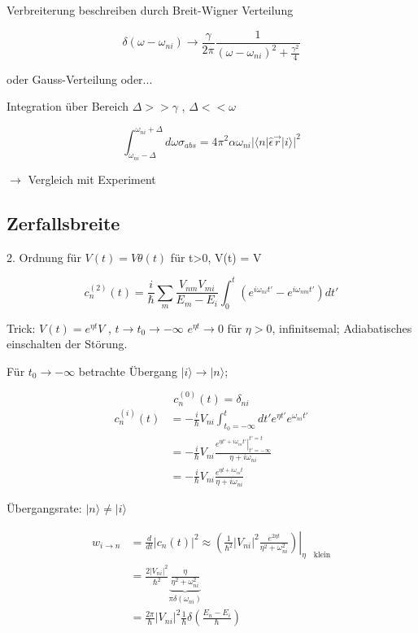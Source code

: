 Verbreiterung beschreiben durch Breit-Wigner Verteilung

\[ \delta(\omega-\omega_{ni}) \rightarrow \frac{\gamma}{2\pi}\frac{1}{(\omega-\omega_{ni})^2+\frac{\gamma^2}{4}}\]

oder Gauss-Verteilung oder...


Integration über Bereich \(\Delta > >\gamma\) , \(\Delta << \omega\)

\[\int_{\omega_{ni}-\Delta}^{\omega_{ni}+\Delta}d\omega\sigma_{abs} = 4\pi^2\alpha \omega_{ni}|\langle n|\hat\epsilon \vec r|i \rangle |^2\]

\(\rightarrow \) Vergleich mit Experiment


\subsection{Zerfallsbreite}

2. Ordnung für \(V(t)=V\theta(t)\) für t>0, V(t) = V

\[c^{(2)}_n(t) = \frac{i}{\hbar}\sum_m\frac{V_{nm}V_{mi}}{E_m-E_i}\int_0^t (e^{i\omega_{ni}t'}-e^{i\omega_{nm}t'})dt'\]

Trick: \(V(t) = e^{\eta t}V\) , \(t\rightarrow t_0\rightarrow -\infty\) \( e^{\eta t}\rightarrow 0\) für \(\eta>0\), infinitsemal; Adiabatisches einschalten der Störung.

Für \(t_0\rightarrow -\infty\) betrachte Übergang \(|i\rangle \rightarrow |n\rangle \);

\[c^{(0)}_n(t) = \delta_{ni}\]
\begin{align}
  c^{(i)}_n(t) &=  -\frac{i}{\hbar}V_{ni}\int_{t_0=-\infty}^t dt' e^{\eta t'}e^{\omega_{ni}t'}\\
  &= -\frac{i}{\hbar}V_{ni}\frac{\left.e^{\eta t'+i\omega_{ni}t'}\right|^{t'=t}_{t'=-\infty}}{\eta+i\omega_{ni}}\\
  &= -\frac{i}{\hbar}V_{ni}\frac{e^{\eta t+i\omega_{ni}t}}{\eta+i\omega_{ni}}
\end{align}

Übergangsrate: \(|n\rangle \neq |i\rangle \)

\begin{align}
  w_{i\rightarrow n} &= \frac{d}{dt} | c_n(t)|^2 \approx\left.\left(\frac{1}{\hbar^2}|V_{ni}|^2\frac{e^{2\eta t}}{\eta^2+\omega_{ni}^2}\right)\right|_{\eta \quad\text{klein}}\\
  &= \frac{2|V_{ni}|^2}{\hbar^2}\underbrace{\frac{\eta}{\eta^2+\omega_{ni}^2}}_{\pi\delta(\omega_{ni})}\\
  &=\frac{2\pi}{\hbar}|V_{ni}|^2 \frac{1}{\hbar}\delta\left(\frac{E_n-E_i}{\hbar}\right)
\end{align}

